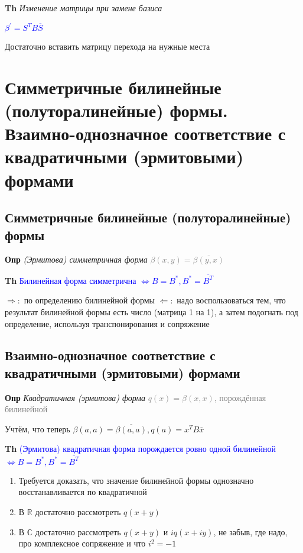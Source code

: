 \documentclass[a4paper, 14pt]{article}
\begin{document}
    \textbf{Th} \textit{Изменение матрицы при замене базиса}
    
    \textcolor{blue}{$\beta^{'} = S^T B \overline{S}$}
    
    Достаточно вставить матрицу перехода на нужные места
    
    \section{Симметричные билинейные (полуторалинейные) формы.
    Взаимно-однозначное соответствие с квадратичными (эрмитовыми) формами}
    
    \subsection{Симметричные билинейные (полуторалинейные) формы}
    
    \textbf{Опр} \textit{(Эрмитова) симметричная форма} \textcolor{gray}{$\beta (x, y) = \overline{\beta (y, x)}$}
    
    \textbf{Th} \textcolor{blue}{Билинейная форма симметрична $\Leftrightarrow B = B^*, B^* = \overline{B^T}$}
    
    $\Rightarrow:$ по определению билинейной формы
    $\Leftarrow:$ надо воспользоваться тем, что результат билинейной формы есть число (матрица 1 на 1), а затем
    подогнать под определение, используя транспонирования и сопряжение
    
    \subsection{Взаимно-однозначное соответствие с квадратичными (эрмитовыми) формами}
    
    \textbf{Опр} \textit{Квадратичная (эрмитова) форма} \textcolor{gray}{$q(x) = \beta (x, x)$, порождённая билинейной}
    
    Учтём, что теперь $\beta (a, a) = \overline{\beta (a, a)}, q(a) =  x^T B \overline{x}$
    
    \textbf{Th} \textcolor{blue}{(Эрмитова) квадратичная форма порождается ровно одной билинейной $\Leftrightarrow B
    = B^*, B^* = \overline{B^T}$}
    
    \begin{enumerate}
        \item Требуется доказать, что значение билинейной формы однозначно восстанавливается по квадратичной
        \item В $\mathbb{R}$ достаточно рассмотреть $q(x + y)$
        \item В $\mathbb{C}$ достаточно рассмотреть $q(x + y)$ и $iq(x + iy)$, не забыв, где надо, про
        комплексное сопряжение и что $i^2 = -1$
    \end{enumerate}
    
\end{document}
